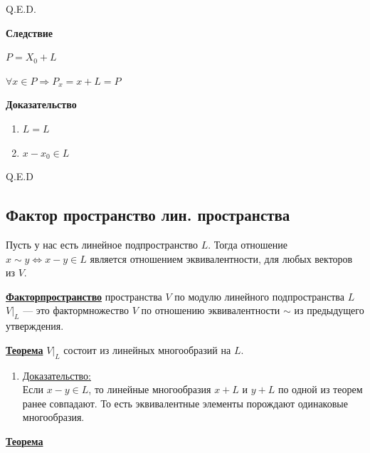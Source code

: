 \documentclass[twoside]{book}
\newcommand{\deff}[1]{\underline{\textbf{#1}}}
\newcommand{\thmm}[1]{\underline{\textbf{#1}}}
\newcommand{\prooff}[1]{{\underline{Доказательство:}} \\ }
\begin{document}
\hfill Q.E.D.

\textbf{Следствие}

\(P = X_0 + L\)

\(\forall x \in P \Rightarrow P_x = x + L = P\)

\textbf{Доказательство}

\begin{enumerate}
    \item \(L = L\)

    \item \(x - x_0 \in L\)
\end{enumerate}

\hfill Q.E.D
\subsection{Фактор пространство лин. пространства}

Пусть у нас есть линейное подпространство $L$. Тогда отношение $x\sim y\Leftrightarrow x-y\in L$ является отношением эквивалентности, для любых векторов из $V$.

\deff{Факторпространство} пространства $V$ {по модулю} линейного {подпространства} $L$ $V\big|_L$ --- это фактормножество $V$ по отношению эквивалентности $\sim$ из предыдущего утверждения.

\thmm{Теорема}
$V\big|_L$ состоит из линейных многообразий на $L$.
\begin{enumerate}
    \item[] \prooff{}
          Если $x-y\in L$, то линейные многообразия $x+L$ и $y+L$ по одной из теорем ранее совпадают. То есть эквивалентные элементы порождают одинаковые многообразия.
\end{enumerate}


\thmm{Теорема}
\end{document}
